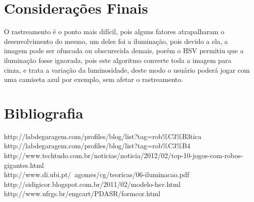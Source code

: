 \documentclass[12pt,openright,twoside,a4paper,brazil]{abntex2}
\begin{document}
\section*{Considerações Finais}

O rastreamento é o ponto mais difícil, pois alguns fatores atrapalharam o desenvolvimento do mesmo, um deles foi a iluminação, pois devido a ela, a imagem pode ser ofuscada ou obscurecida demais, porém o HSV permitiu que a iluminação fosse ignorada, pois este algoritmo converte toda a imagem para cinza, e trata a variação da luminosidade, deste modo o usuário poderá jogar com uma camiseta azul por exemplo, sem afetar o rastreamento.



\section*{Bibliografia}

http://labdegaragem.com/profiles/blog/list?tag=rob\%C3\%B3tica \\
http://labdegaragem.com/profiles/blog/list?tag=rob\%C3\%B4 \\
http://www.techtudo.com.br/noticias/noticia/2012/02/top-10-jogos-com-robos-gigantes.html \\
http://www.di.ubi.pt/~agomes/cg/teoricas/06-iluminacao.pdf \\
http://sidigicor.blogspot.com.br/2011/02/modelo-hsv.html \\
http://www.ufrgs.br/engcart/PDASR/formcor.html
\end{document}
